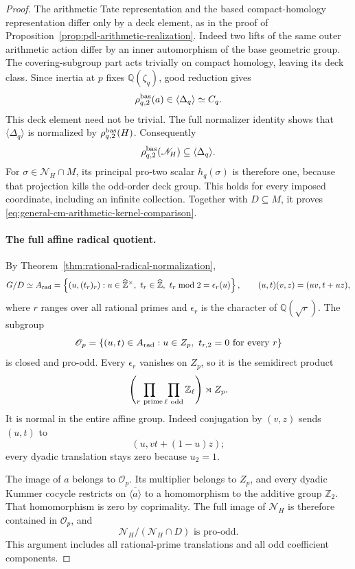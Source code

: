 \begin{proof}
The arithmetic Tate representation and the based
compact-homology representation differ only by a
deck element, as in the proof of
Proposition~\ref{prop:pdl-arithmetic-realization}.
Indeed two lifts of the same outer arithmetic action
differ by an inner automorphism of the base geometric
group. The covering-subgroup part acts trivially on
compact homology, leaving its deck class.
Since inertia at \(p\) fixes \(\mathbb Q(\zeta_q)\),
good reduction gives
\[
                 \rho^{\rm bas}_{q,2}(a)\in
                              \langle\Delta_q\rangle\simeq C_q.
\]
This deck element need not be trivial.
The full normalizer identity shows that
\(\langle\Delta_q\rangle\) is normalized by
\(\rho^{\rm bas}_{q,2}(H)\).
Consequently
\[
                 \rho^{\rm bas}_{q,2}(\mathscr N_H)
                                  \subseteq\langle\Delta_q\rangle.
\]
For \(\sigma\in\mathscr N_H\cap M\), its principal
pro-two scalar \(h_q(\sigma)\) is therefore one,
because that projection kills the odd-order deck group.
This holds for every imposed coordinate, including
an infinite collection.
Together with \(D\subseteq M\), it proves
\eqref{eq:general-cm-arithmetic-kernel-comparison}.

\paragraph{The full affine radical quotient.}
By Theorem~\ref{thm:rational-radical-normalization},
\[
 G/D\simeq A_{\rm rad}
  =\left\{(u,(t_r)_r):
      u\in\widehat{\mathbb Z}^{\times},\
      t_r\in\widehat{\mathbb Z},\
      t_r\bmod2=\epsilon_r(u)\right\},
 \qquad (u,t)(v,z)=(uv,t+uz),
\]
where \(r\) ranges over all rational primes and
\(\epsilon_r\) is the character of \(\mathbb Q(\sqrt r)\).
The subgroup
\[
 \mathscr O_p
   =\{(u,t)\in A_{\rm rad}:u\in Z_p,\
                    t_{r,2}=0\text{ for every }r\}
\]
is closed and pro-odd.
Every \(\epsilon_r\) vanishes on \(Z_p\), so it is
the semidirect product
\[
 \left(\prod_{r\ {\rm prime}}\prod_{\ell\ {\rm odd}}\mathbb Z_\ell\right)
                                      \rtimes Z_p.
\]
It is normal in the entire affine group.
Indeed conjugation by \((v,z)\) sends \((u,t)\) to
\[
                            (u,vt+(1-u)z);
\]
every dyadic translation stays zero because \(u_2=1\).

The image of \(a\) belongs to \(\mathscr O_p\).
Its multiplier belongs to \(Z_p\), and every
dyadic Kummer cocycle restricts on
\(\overline{\langle a\rangle}\) to a homomorphism
to the additive group \(\mathbb Z_2\).
That homomorphism is zero by coprimality.
The full image of \(\mathscr N_H\) is therefore
contained in \(\mathscr O_p\), and
\[
                        \mathscr N_H/(\mathscr N_H\cap D)
                                         \text{ is pro-odd}.
\]
This argument includes all rational-prime translations
and all odd coefficient components.


\end{proof}

